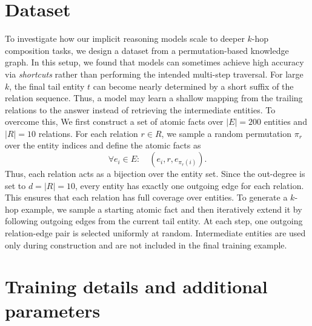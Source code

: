 \section{Dataset}
\label{app:permutation}
To investigate how our implicit reasoning models scale to deeper $k$-hop composition tasks, we design a dataset from a permutation-based knowledge graph. In this setup, we found that models can sometimes achieve high accuracy via \emph{shortcuts} rather than performing the intended multi-step traversal. For large $k$, the final tail entity $t$ can become nearly determined by a short suffix of the relation sequence. Thus, a model may learn a shallow mapping from the trailing relations to the answer instead of retrieving the intermediate entities. To overcome this, We first construct a set of atomic facts over $|E|=200$ entities and $|R|=10$ relations. For each relation $r \in R$, we sample a random permutation $\pi_r$ over the entity indices and define the atomic facts as
\[
\forall e_i \in E:\quad (e_i, r, e_{\pi_r(i)}).
\]
Thus, each relation acts as a bijection over the entity set. Since the out-degree is set to $d=|R|=10$, every entity has exactly one outgoing edge for each relation. This ensures that each relation has full coverage over entities. To generate a $k$-hop example, we sample a starting atomic fact and then iteratively extend it by following outgoing edges from the current tail entity. At each step, one outgoing relation-edge pair is selected uniformly at random. Intermediate entities are used only during construction and are not included in the final training example. 



\section{Training details and additional parameters}\label{app:training}

